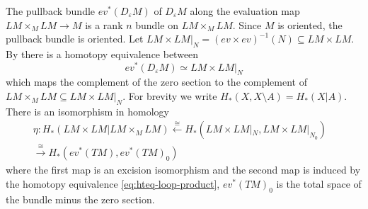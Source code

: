 \documentclass{scrartcl}
\theoremstyle{plain}
\newtheorem{lemma}[theorem]{Lemma}
\theoremstyle{definition}
\renewcommand{\epsilon}{\varepsilon}
\renewcommand{\subset}{\subseteq}
\newcommand{\iso}{\cong}
\newcommand{\quiso}{\simeq}
\let\xto\xrightarrow
\let\xfrom\xleftarrow
\newcommand{\injto}{\hookrightarrow}
\renewcommand{\coprod}{\mathbin{\amalg}}
\begin{document}
The pullback bundle $ev^*(D_\epsilon M)$ of $D_\epsilon M$ along the evaluation map $LM\times_M LM\to M$ is a rank $n$ bundle on $LM\times_M LM$. Since $M$ is oriented, the pullback bundle is oriented. Let $LM\times LM|_N = (ev\times ev)^{-1}(N)\subset LM\times LM$. By \cite[p. 8]{cohen2002homotopy} there is a homotopy equivalence between 
\begin{equation}ev^*(D_\epsilon M) \quiso LM\times LM|_N\label{eq:hteq-loop-product}\end{equation}
which maps the complement of the zero section to the complement of $LM\times_M LM\subset LM\times LM|_N$. For brevity we write $H_*(X, X\setminus A) = H_*(X | A)$. There is an isomorphism in homology 
\begin{align*}
\eta\colon H_*(LM\times LM | LM\times_M LM) \xfrom{\iso} H_*(LM\times LM |_N, LM\times LM|_{N_0}) &\\ \xto{\iso} H_*(ev^*(TM), ev^*(TM)_0)&
\end{align*}
where the first map is an excision isomorphism and the second map is induced by the homotopy equivalence \ref{eq:hteq-loop-product}, $ev^*(TM)_0$ is the total space of the bundle minus the zero section.


    
    
\end{document}

